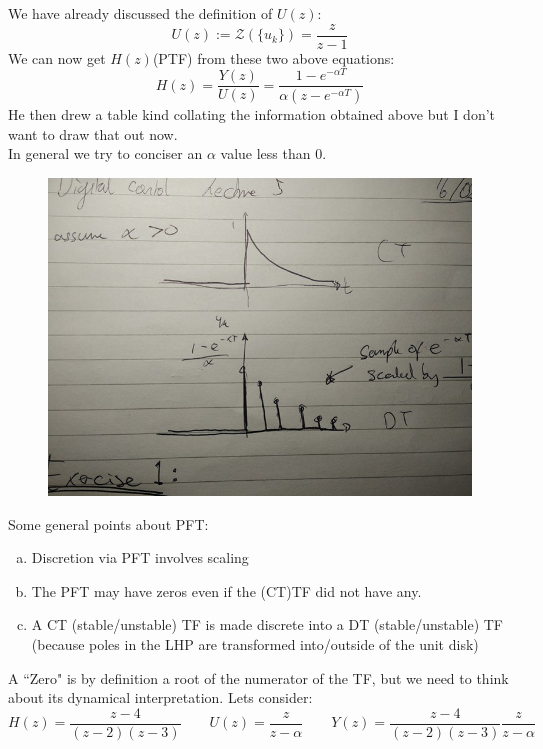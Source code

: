 \documentclass[a4paper,11pt]{article}
\begin{document}
	We have already discussed the definition of $U(z)$:
	\begin{equation}
		U(z) := \mathcal{Z}(\{u_k\})=\frac{z}{z-1}
	\end{equation}	
	We can now get $H(z)$(PTF) from these two above equations:
	\begin{equation}
		H(z)=\frac{Y(z)}{U(z)}=\frac{1-e^{-\alpha T}}{\alpha(z-e^{-\alpha T})}
	\end{equation}
	He then drew a table kind collating the information obtained above but I don't want to draw that out now.\\
	In general we try to conciser an $\alpha$ value less than 0.\\
	
	\begin{figure}[htp]
		\centering
		\includegraphics[scale=0.4]{images/CT-DT}
	\end{figure}
	Some general points about PFT:
	\begin{enumerate}[a)]
		\item Discretion via PFT involves scaling
		\item The PFT may have zeros even if the (CT)TF did not have any.
		\item A CT (stable/unstable) TF is made discrete into a DT (stable/unstable) TF (because poles in the LHP are transformed into/outside of the unit disk)\\
	\end{enumerate}
	A ``Zero" is by definition a root of the numerator of the TF, but we need to think about its dynamical interpretation. Lets consider:
	\begin{equation}
		H(z) = \frac{z-4}{(z-2)(z-3)}\qquad U(z)= \frac{z}{z-\alpha}\qquad Y(z)=\frac{z-4}{(z-2)(z-3)}\frac{z}{z-\alpha}
	\end{equation} 
\end{document}
